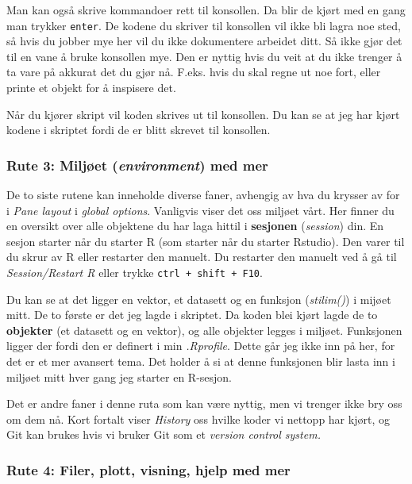 \documentclass[
  letterpaper,
  DIV=11,
  numbers=noendperiod]{scrartcl}
\begin{document}
Man kan også skrive kommandoer rett til konsollen. Da blir de kjørt med
en gang man trykker \texttt{enter}. De kodene du skriver til konsollen
vil ikke bli lagra noe sted, så hvis du jobber mye her vil du ikke
dokumentere arbeidet ditt. Så ikke gjør det til en vane å bruke
konsollen mye. Den er nyttig hvis du veit at du ikke trenger å ta vare
på akkurat det du gjør nå. F.eks. hvis du skal regne ut noe fort, eller
printe et objekt for å inspisere det.

Når du kjører skript vil koden skrives ut til konsollen. Du kan se at
jeg har kjørt kodene i skriptet fordi de er blitt skrevet til konsollen.

\hypertarget{rute-3-miljuxf8et-environment-med-mer}{%
\subsubsection{\texorpdfstring{Rute 3: Miljøet (\emph{environment}) med
mer}{Rute 3: Miljøet (environment) med mer}}\label{rute-3-miljuxf8et-environment-med-mer}}

De to siste rutene kan inneholde diverse faner, avhengig av hva du
krysser av for i \emph{Pane layout} i \emph{global options}. Vanligvis
viser det oss miljøet vårt. Her finner du en oversikt over alle
objektene du har laga hittil i \textbf{sesjonen} (\emph{session}) din.
En sesjon starter når du starter R (som starter når du starter Rstudio).
Den varer til du skrur av R eller restarter den manuelt. Du restarter
den manuelt ved å gå til \emph{Session/Restart R} eller trykke
\texttt{ctrl\ +\ shift\ +\ F10}.

Du kan se at det ligger en vektor, et datasett og en funksjon
(\emph{stilim()}) i mijøet mitt. De to første er det jeg lagde i
skriptet. Da koden blei kjørt lagde de to \textbf{objekter} (et datasett
og en vektor), og alle objekter legges i miljøet. Funksjonen ligger der
fordi den er definert i min \emph{.Rprofile}. Dette går jeg ikke inn på
her, for det er et mer avansert tema. Det holder å si at denne
funksjonen blir lasta inn i miljøet mitt hver gang jeg starter en
R-sesjon.

Det er andre faner i denne ruta som kan være nyttig, men vi trenger ikke
bry oss om dem nå. Kort fortalt viser \emph{History} oss hvilke koder vi
nettopp har kjørt, og Git kan brukes hvis vi bruker Git som et
\emph{version control system.}

\hypertarget{rute-4-filer-plott-visning-hjelp-med-mer}{%
\subsubsection{Rute 4: Filer, plott, visning, hjelp med
mer}\label{rute-4-filer-plott-visning-hjelp-med-mer}}
\end{document}
